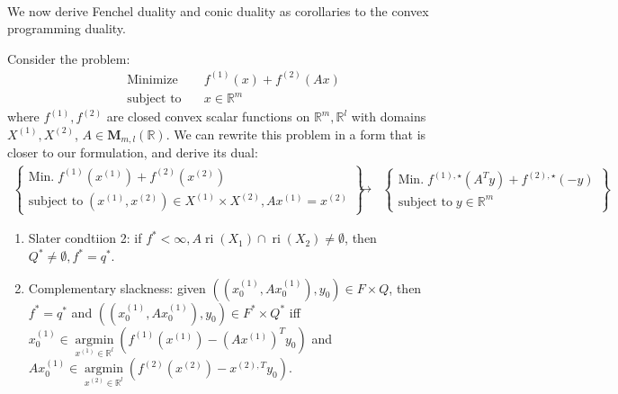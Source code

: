 \paragraph{}We now derive Fenchel duality and conic duality as corollaries to the convex programming duality.

\begin{coro}\label{coro:044-fenchel}
	Consider the problem:
	\begin{align*}
		\text{Minimize}\quad   & f^{(1)}(x)+f^{(2)}(Ax) \\
		\text{subject to}\quad & x\in \mathbb{R}^m
	\end{align*}
	where $f^{(1)},f^{(2)}$ are closed convex scalar functions on $\mathbb{R}^m,\mathbb{R}^l$ with domains $X^{(1)},X^{(2)}$, $A\in \mathbf{M}_{m,l}(\mathbb{R})$. We can rewrite this problem in a form that is closer to our formulation, and derive its dual:
	\[
		\begin{matrix}
			\begin{Bmatrix}
				\text{Min.}\;    f^{(1)}(x^{(1)})+f^{(2)}(x^{(2)}) \\
				\text{subject to}\;  (x^{(1)},x^{(2)})\in X^{(1)}\times X^{(2)},Ax^{(1)}=x^{(2)}
			\end{Bmatrix} & \leftrightarrow &
			\begin{Bmatrix}
				\text{Min.}\;    f^{(1),\star}(A^Ty)+f^{(2),\star}(-y) \\
				\text{subject to}\;    y\in \mathbb{R}^m
			\end{Bmatrix}
		\end{matrix}
	\]
	\begin{enumerate}[label=(\alph*)]
		\item Slater condtiion 2: if $f^\ast<\infty,A \operatorname{ri}(X_1)\cap \operatorname{ri}(X_2)\neq\emptyset$, then $Q^\ast\neq\emptyset,f^\ast=q^\ast$.
		\item Complementary slackness: given $((x^{(1)}_0,Ax^{(1)}_0),y_0)\in F\times Q$, then $f^\ast=q^\ast$ and $((x^{(1)}_0,Ax^{(1)}_0),y_0)\in F^\ast\times Q^\ast$ iff $x_0^{(1)}\in \underset{x^{(1)}\in \mathbb{R}^l}{\operatorname{argmin}}\left(f^{(1)}(x^{(1)})-(Ax^{(1)})^Ty_0\right)$ and $Ax_0^{(1)}\in \underset{x^{(2)}\in \mathbb{R}^l}{\operatorname{argmin}}\left(f^{(2)}(x^{(2)})-x^{(2),T}y_0\right)$.
	\end{enumerate}
\end{coro}

